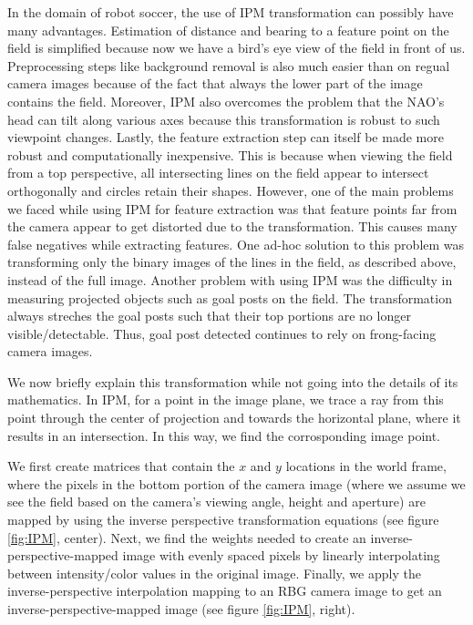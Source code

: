 \documentclass[	DIV=calc,%
							paper=a4,%
							fontsize=9pt,%
							twocolumn]{scrartcl}	 					%
\begin{document}
In the domain of robot soccer, the use of IPM transformation can possibly have many advantages. %
Estimation of distance and bearing to a feature point on the field is simplified because now we have a bird's eye view of the field in front of us. Preprocessing steps like background removal is also much easier than on regual camera images because of the fact that always the lower part of the image contains the field. Moreover, IPM also overcomes the problem that the NAO's head can tilt along various axes because this transformation is robust to such viewpoint changes. Lastly, the feature extraction step can itself be made more robust and computationally inexpensive. This is because when viewing the field from a top perspective, all intersecting lines on the field appear to intersect orthogonally and circles retain their shapes. However, one of the main problems we faced while using IPM for feature extraction was that feature points far from the camera appear to get distorted due to the transformation. This causes many false negatives while extracting features. One ad-hoc solution to this problem was transforming only the binary images of the lines in the field, as described above, instead of the full image. Another problem with using IPM was the difficulty in measuring projected objects such as goal posts on the field. The transformation always streches the goal posts such that their top portions are no longer visible/detectable. Thus, goal post detected continues to rely on frong-facing camera images.

We now briefly explain this transformation\cite{IPM} while not going into the details of its mathematics. In IPM, for a point in the image plane, we trace a ray from this point through the center of projection and towards the horizontal plane, where it results in an intersection. In this way, we find the corrosponding image point.

We first create matrices that contain the $x$ and $y$ locations in the world frame, where the pixels in the bottom portion of the camera image (where we assume we see the field based on the camera's viewing angle, height and aperture) are mapped by using the inverse perspective transformation equations (see figure \ref{fig:IPM}, center). Next, we find the weights needed to create an inverse-perspective-mapped image with evenly spaced pixels by linearly interpolating between intensity/color values in the original image. Finally, we apply the inverse-perspective interpolation mapping to an RBG camera image to get an inverse-perspective-mapped image\cite{IPMCode} (see figure \ref{fig:IPM}, right).
\end{document}
